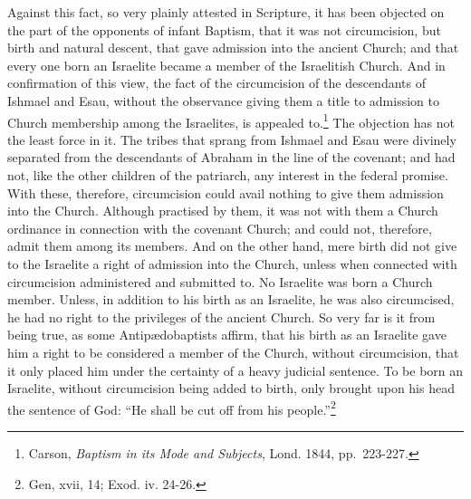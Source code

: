 \documentclass[]{book}
\begin{document}
Against this fact, so very plainly attested in Scripture, it has been objected on the part of the opponents of infant Baptism, that it was not circumcision, but birth and natural descent, that gave admission into the ancient Church; and that every one born an Israelite became a member of the Israelitish Church. And in confirmation of this view, the fact of the circumcision of the descendants of Ishmael and Esau, without the observance giving them a title to admission to Church membership among the Israelites, is appealed to.\footnote{Carson, \emph{Baptism in its Mode and Subjects}, Lond. 1844, pp.~223-227.} The objection has not the least force in it. The tribes that sprang from Ishmael and Esau were divinely separated from the descendants of Abraham in the line of the covenant; and had not, like the other children of the patriarch, any interest in the federal promise. With these, therefore, circumcision could avail nothing to give them admission into the Church. Although practised by them, it was not with them a Church ordinance in connection with the covenant Church; and could not, therefore, admit them among its members. And on the other hand, mere birth did not give to the Israelite a right of admission into the Church, unless when connected with circumcision administered and submitted to. No Israelite was born a Church member. Unless, in addition to his birth as an Israelite, he was also circumcised, he had no right to the privileges of the ancient Church. So very far is it from being true, as some Antipædobaptists affirm, that his birth as an Israelite gave him a right to be considered a member of the Church, without circumcision, that it only placed him under the certainty of a heavy judicial sentence. To be born an Israelite, without circumcision being added to birth, only brought upon his head the sentence of God: ``He shall be cut off from his people.''\footnote{Gen, xvii, 14; Exod. iv. 24-26.}
\end{document}
